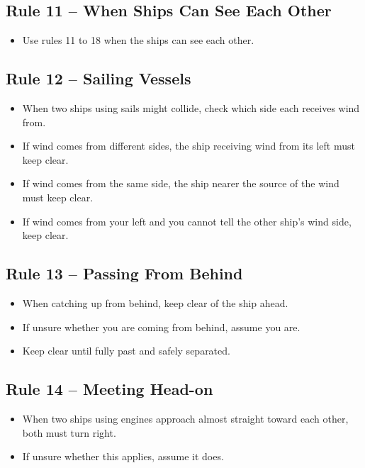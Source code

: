 \documentclass[10pt]{reportMaster}
\begin{document}
\subsection*{Rule 11 -- When Ships Can See Each Other}
\begin{itemize}
\item Use rules 11 to 18 when the ships can see each other.
\end{itemize}

\subsection*{Rule 12 -- Sailing Vessels}
\begin{itemize}
\item When two ships using sails might collide, check which side each receives wind from.
\item If wind comes from different sides, the ship receiving wind from its left must keep clear.
\item If wind comes from the same side, the ship nearer the source of the wind must keep clear.
\item If wind comes from your left and you cannot tell the other ship's wind side, keep clear.
\end{itemize}

\subsection*{Rule 13 -- Passing From Behind}
\begin{itemize}
\item When catching up from behind, keep clear of the ship ahead.
\item If unsure whether you are coming from behind, assume you are.
\item Keep clear until fully past and safely separated.
\end{itemize}

\subsection*{Rule 14 -- Meeting Head-on}
\begin{itemize}
\item When two ships using engines approach almost straight toward each other, both must turn right.
\item If unsure whether this applies, assume it does.
\end{itemize}
\end{document}
